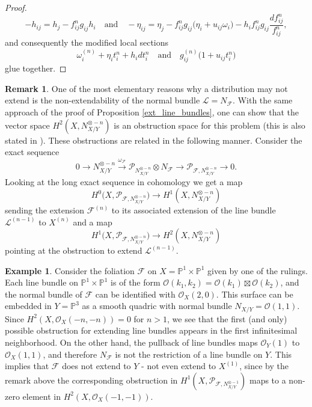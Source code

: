 \documentclass[reqno]{amsart}
\theoremstyle{plain}
\renewcommand\P{\mathbb{P}}
\newcommand{\OO}{\mathcal{O}}
\renewcommand{\L}{\mathcal{L}}
\newcommand{\F}{\mathscr{F}}
\newcommand{\PP}{\mathcal{P}}
\theoremstyle{definition}
\newtheorem{remark}[theorem]{Remark}
\newtheorem{example}[theorem]{Example}
\theoremstyle{named}
\begin{document}
\begin{proof}
\[
-h_{ij} = h_{j}-f_{ij}^ng_{ij}h_i\quad\text{and}\quad -\eta_{ij} = \eta_{j}-f_{ij}^ng_{ij}\big(\eta_{i}+u_{ij}\omega_i\big) -h_i f_{ij}^ng_{ij} \frac{df_{ij}^n}{f_{ij}^n},
\]
and consequently the modified local sections
\[
\omega_i^{(n)}+ \eta_it_i^n+h_idt_i^n\quad\text{and}\quad g_{ij}^{(n)}\big(1+u_{ij}t_i^n\big) 
\]
glue together.
\end{proof}

\begin{remark} One of the most elementary reasons why a distribution may not extend is the non-extendability of the normal bundle $\L = N_{\F}$. With the same approach of the proof of Proposition \ref{ext_line_bundles}, one can show that the vector space $H^2(X,N_{X/Y}^{\otimes - n})$ is an obstruction space for this problem (this is also stated in \cite[Section 5.a]{griffiths1966extension}). These obstructions are related in the following manner. Consider the exact sequence
\[
0\rightarrow N_{X/Y}^{\otimes - n}\xrightarrow{\omega_\F} \PP_{N_{X/Y}^{\otimes - n}}\otimes N_\F\rightarrow \PP_{\F,N_{X/Y}^{\otimes - n}}\rightarrow 0.
\]
Looking at the long exact sequence in cohomology we get a map 
\[
H^0\big(X,\PP_{\F,N_{X/Y}^{\otimes - n}}\big)\rightarrow H^1(X,N_{X/Y}^{\otimes - n})
\]
sending the extension $\F^{(n)}$ to its associated extension of the line bundle $\L^{(n-1)}$ to $X^{(n)}$ and a map 
\[
H^1\big(X,\PP_{\F,N_{X/Y}^{\otimes - n}}\big)\rightarrow H^2(X,N_{X/Y}^{\otimes - n})
\]
pointing at the obstruction to extend $\L^{(n-1)}$. 
\end{remark}

\begin{example}\cite[Section 2.1]{cerveau2013quelques}\label{ej:cerveau} 
Consider the foliation $\F$ on $X = \P^1\times \P^1$ given by one of the rulings. Each line bundle on $\P^1\times\P^1$ is of the form $\OO(k_1,k_2)=\OO(k_1)\boxtimes\OO(k_2)$, and the normal bundle of $\F$ can be identified with $\OO_X(2,0)$. This surface can be embedded in $Y = \P^3$ as a smooth quadric with normal bundle $N_{X/Y} = \OO(1,1)$. Since $H^2(X,\OO_X(-n,-n))=0$ for $n>1$, we see that the first (and only) possible obstruction for extending line bundles appears in the first infinitesimal neighborhood.
On the other hand, the pullback of line bundles maps $\OO_Y(1)$ to $\OO_X(1,1)$, and therefore $N_\F$ is not the restriction of a line bundle on $Y$. This implies that $\F$ does not extend to $Y$ - not even extend to $X^{(1)}$, since by the remark above the corresponding obstruction in $H^1(X,\PP_{\F,N_{X/Y}^{\otimes - 1}})$ maps to a non-zero element in $H^2(X,\OO_X(-1,-1))$.
\end{example}
\end{document}
